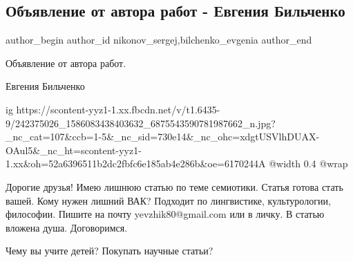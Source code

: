  
 
 
 
 
 
\subsection{Объявление от автора работ - Евгения Бильченко}
\label{sec:21_09_2021.fb.nikonov_sergej.8.bilchenko_objavlenie_rabota}
 
\ifcmt
 author_begin
   author_id nikonov_sergej,bilchenko_evgenia
 author_end
\fi

Объявление от автора работ.

Евгения Бильченко

\ifcmt
  ig https://scontent-yyz1-1.xx.fbcdn.net/v/t1.6435-9/242375026_1586083438403632_6875543590781987662_n.jpg?_nc_cat=107&ccb=1-5&_nc_sid=730e14&_nc_ohc=xdgtUSVlhDUAX-OAul5&_nc_ht=scontent-yyz1-1.xx&oh=52a6396511b2dc2fbfc6e185ab4e286b&oe=6170244A
  @width 0.4
  @wrap 
\fi

Дорогие друзья! Имею лишнюю статью по теме семиотики. Статья готова стать
вашей. Кому нужен лишний ВАК? Подходит по лингвистике, культурологии,
философии. Пишите на почту yevzhik80@gmail.com или в личку. В статью вложена
душа. Договоримся.

\begin{itemize} %
Чему вы учите детей? Покупать научные статьи?
\end{itemize} %
